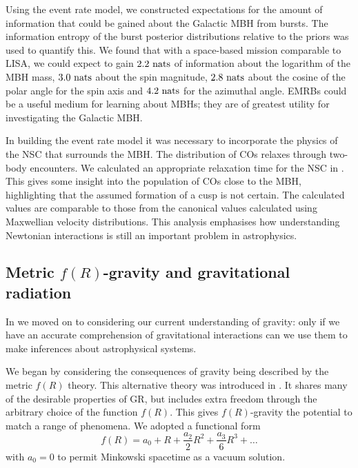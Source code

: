 Using the event rate model, we constructed expectations for the amount of information that could be gained about the Galactic MBH from bursts. The information entropy of the burst posterior distributions relative to the priors was used to quantify this. We found that with a space-based mission comparable to LISA, we could expect to gain $2.2~\mathrm{nats}$ of information about the logarithm of the MBH mass, $3.0~\mathrm{nats}$ about the spin magnitude, $2.8~\mathrm{nats}$ about the cosine of the polar angle for the spin axis and $4.2~\mathrm{nats}$ for the azimuthal angle. EMRBs could be a useful medium for learning about MBHs; they are of greatest utility for investigating the Galactic MBH.

In building the event rate model it was necessary to incorporate the physics of the NSC that surrounds the MBH. The distribution of COs relaxes through two-body encounters. We calculated an appropriate relaxation time for the NSC in . This gives some insight into the population of COs close to the MBH, highlighting that the assumed formation of a cusp is not certain. The calculated values are comparable to those from the canonical values calculated using Maxwellian velocity distributions. This analysis emphasises how understanding Newtonian interactions is still an important problem in astrophysics.

\subsection{Metric $f(R)$-gravity and gravitational radiation}\label{sec:Review-f-R}

In  we moved on to considering our current understanding of gravity: only if we have an accurate comprehension of gravitational interactions can we use them to make inferences about astrophysical systems.

We began by considering the consequences of gravity being described by the metric $f(R)$ theory. This alternative theory was introduced in . It shares many of the desirable properties of GR, but includes extra freedom through the arbitrary choice of the function $f(R)$. This gives $f(R)$-gravity the potential to match a range of phenomena. We adopted a functional form
\begin{equation}
f(R) = a_0 + R + \frac{a_2}{2}R^2 + \frac{a_3}{6}R^3 + \ldots
\end{equation}
with $a_0 = 0$ to permit Minkowski spacetime as a vacuum solution.

